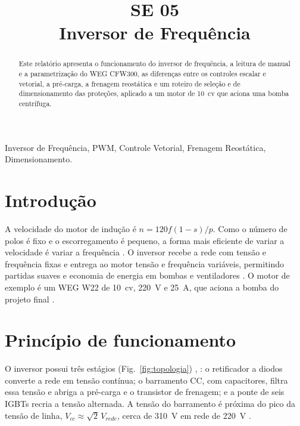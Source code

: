 \documentclass[conference]{IEEEtran}
\begin{document}
\raggedbottom

\title{SE 05\\Inversor de Frequência}

\author{
}

\maketitle

\begin{abstract}
Este relatório apresenta o funcionamento do inversor de frequência, a leitura de manual e a parametrização do WEG CFW300, as diferenças entre os controles escalar e vetorial, a pré-carga, a frenagem reostática e um roteiro de seleção e de dimensionamento das proteções, aplicado a um motor de 10~cv que aciona uma bomba centrífuga.
\end{abstract}

\begin{IEEEkeywords}
Inversor de Frequência, PWM, Controle Vetorial, Frenagem Reostática, Dimensionamento.
\end{IEEEkeywords}

\section{Introdução}

A velocidade do motor de indução é $n=120f(1-s)/p$. Como o número de polos é fixo e o escorregamento é pequeno, a forma mais eficiente de variar a velocidade é variar a frequência \cite{b1}. O inversor recebe a rede com tensão e frequência fixas e entrega ao motor tensão e frequência variáveis, permitindo partidas suaves e economia de energia em bombas e ventiladores \cite{b2}. O motor de exemplo é um WEG W22 de 10~cv, 220~V e 25~A, que aciona a bomba do projeto final \cite{b12}.

\section{Princípio de funcionamento}

O inversor possui três estágios (Fig.~\ref{fig:topologia}) \cite{b1}, \cite{b3}: o retificador a diodos converte a rede em tensão contínua; o barramento CC, com capacitores, filtra essa tensão e abriga a pré-carga e o transistor de frenagem; e a ponte de seis IGBTs recria a tensão alternada. A tensão do barramento é próxima do pico da tensão de linha, $V_{cc}\approx\sqrt{2}\,V_{rede}$, cerca de 310~V em rede de 220~V \cite{b5}.
\end{document}
